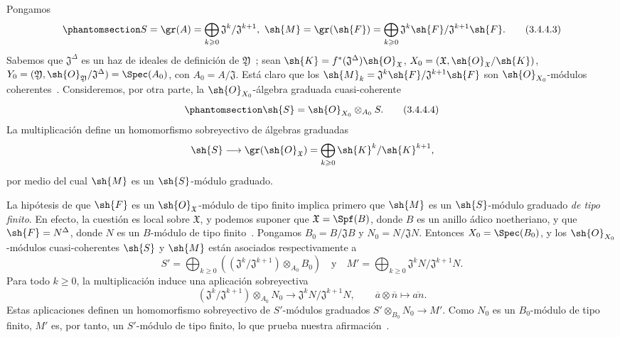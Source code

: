 \documentclass[oneside]{amsart}
\renewcommand{\geq}{\geqslant}
\newcommand{\oldpage}[2][]{{\marginnote{\normalfont\textbf{#1}~|~#2}}\ignorespaces}
\let\EGAOriginalLabel\label
\renewcommand{\label}[1]{\phantomsection\EGAOriginalLabel{#1}}
\begin{document}
Pongamos
\[
\label{III.3.4.4.3}
  S=\gr(A)=\bigoplus_{k\geq 0}\mathfrak{J}^k/\mathfrak{J}^{k+1},\ \sh{M}=\gr(\sh{F})=\bigoplus_{k\geq 0}\mathfrak{J}^k\sh{F}/\mathfrak{J}^{k+1}\sh{F}. \tag{3.4.4.3}
\]
Sabemos que $\mathfrak{J}^\Delta$ es un haz de ideales de definición de $\mathfrak{Y}$~; sean $\sh{K}=f^*(\mathfrak{J}^\Delta)\sh{O}_\mathfrak{X}$, $X_0=(\mathfrak{X},\sh{O}_\mathfrak{X}/\sh{K})$, $Y_0=(\mathfrak{Y},\sh{O}_\mathfrak{Y}/\mathfrak{J}^\Delta)=\Spec(A_0)$, con $A_0=A/\mathfrak{J}$.
Está claro que los $\sh{M}_k=\mathfrak{J}^k\sh{F}/\mathfrak{J}^{k+1}\sh{F}$ son $\sh{O}_{X_0}$-módulos coherentes~.
Consideremos, por otra parte, la $\sh{O}_{X_0}$-álgebra graduada cuasi-coherente
\[
\label{III.3.4.4.4}
  \sh{S}=\sh{O}_{X_0}\otimes_{A_0}S.
  \tag{3.4.4.4}
\]
La multiplicación define un homomorfismo sobreyectivo de álgebras graduadas
\[
  \sh{S}\longrightarrow\gr(\sh{O}_\mathfrak{X})
  =\bigoplus_{k\geq 0}\sh{K}^k/\sh{K}^{k+1},
\]
por medio del cual $\sh{M}$ es un $\sh{S}$-módulo graduado.

\begingroup
{}
La hipótesis de que $\sh{F}$ es un $\sh{O}_\mathfrak{X}$-módulo de tipo finito implica primero que $\sh{M}$ es
\oldpage[III]{121}
un $\sh{S}$-módulo graduado \emph{de tipo finito}.
En efecto, la cuestión es local sobre $\mathfrak{X}$, y podemos suponer que $\mathfrak{X}=\Spf(B)$, donde $B$ es un anillo ádico noetheriano, y que $\sh{F}=N^\Delta$, donde $N$ es un $B$-módulo de tipo finito~.
Pongamos $B_0=B/\mathfrak{J}B$ y $N_0=N/\mathfrak{J}N$.
Entonces $X_0=\Spec(B_0)$, y los $\sh{O}_{X_0}$-módulos cuasi-coherentes $\sh{S}$ y $\sh{M}$ están asociados respectivamente a
\[
  S'=\bigoplus_{k\geq 0}((\mathfrak{J}^k/\mathfrak{J}^{k+1})\otimes_{A_0}B_0)\quad\text{y}\quad
  M'=\bigoplus_{k\geq 0}\mathfrak{J}^kN/\mathfrak{J}^{k+1}N.
\]
Para todo $k\geq 0$, la multiplicación induce una aplicación sobreyectiva
\[
  (\mathfrak{J}^k/\mathfrak{J}^{k+1})\otimes_{A_0}N_0
  \longrightarrow\mathfrak{J}^kN/\mathfrak{J}^{k+1}N,
  \qquad \overline a\otimes\overline n\longmapsto\overline{an}.
\]
Estas aplicaciones definen un homomorfismo sobreyectivo de $S'$-módulos graduados $S'\otimes_{B_0}N_0\longrightarrow M'$.
Como $N_0$ es un $B_0$-módulo de tipo finito, $M'$ es, por tanto, un $S'$-módulo de tipo finito, lo que prueba nuestra afirmación~.
\par\endgroup
\end{document}
